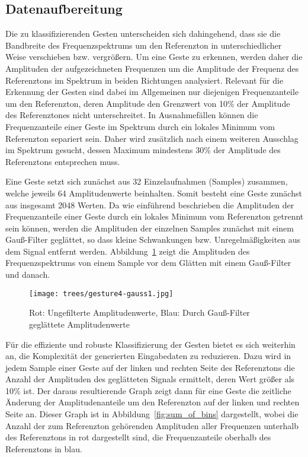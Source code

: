 \subsection{Datenaufbereitung}
\label{sect:Trees_Datenaufbereitung}

Die zu klassifizierenden Gesten unterscheiden sich dahingehend, dass sie die Bandbreite 
des Frequenzspektrums um den Referenzton in unterschiedlicher Weise verschieben bzw. vergrößern. 
Um eine Geste zu erkennen, werden daher die Amplituden der aufgezeichneten Frequenzen 
um die Amplitude der Frequenz des Referenztons im Spektrum in beiden Richtungen analysiert. 
Relevant für die Erkennung der Gesten sind dabei im Allgemeinen nur diejenigen Frequenzanteile 
um den Referenzton, deren Amplitude den Grenzwert von 10\% der Amplitude des Referenztones nicht unterschreitet. 
In Ausnahmefällen können die Frequenzanteile einer Geste im Spektrum durch ein lokales Minimum vom Referenzton 
separiert sein. Daher wird zusätzlich nach einem weiteren Ausschlag im Spektrum gesucht, 
dessen Maximum mindestens 30\% der Amplitude des Referenztons entsprechen muss.


Eine Geste setzt sich zunächst aus 32 Einzelaufnahmen (Samples) zusammen, welche jeweils 
64 Amplitudenwerte beinhalten. Somit besteht eine Geste zunächst aus insgesamt 2048 Werten.
Da wie einführend beschrieben die Amplituden der Frequenzanteile einer Geste durch ein lokales Minimum vom Referenzton 
getrennt sein können, werden die Amplituden der einzelnen Samples zunächst mit einem Gauß-Filter geglättet, 
so dass kleine Schwankungen bzw. Unregelmäßigkeiten aus dem Signal entfernt werden. 
Abbildung~\ref{fig:gauss} zeigt die Amplituden des Frequenzspektrums von einem Sample 
vor dem Glätten mit einem Gauß-Filter und danach.

\begin{figure}[htbp] \centering
\texttt{[image: trees/gesture4-gauss1.jpg]}
\caption{Rot: Ungefilterte Amplitudenwerte, Blau: Durch Gauß-Filter geglättete Amplitudenwerte}
\label{fig:gauss}
\end{figure}

Für die effiziente und robuste Klassifizierung der Gesten bietet es sich weiterhin an, 
die Komplexität der generierten Eingabedaten zu reduzieren. Dazu wird in jedem Sample einer Geste 
auf der linken und rechten Seite des Referenztons die Anzahl der Amplituden des geglätteten Signals ermittelt, 
deren Wert größer als 10\% ist. Der daraus resultierende Graph zeigt dann für eine Geste die zeitliche 
Änderung der Amplitudenanteile um den Referenzton auf der linken und rechten Seite an. Dieser Graph ist in Abbildung~\ref{fig:sum_of_bins} dargestellt, wobei die Anzahl der zum Referenzton gehörenden Amplituden aller Frequenzen unterhalb des
Referenztons in rot dargestellt sind, die Frequenzanteile oberhalb des Referenztons in blau.


